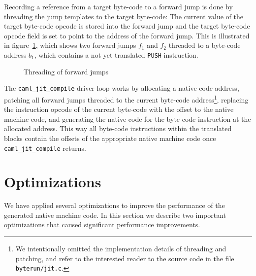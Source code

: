 \documentclass[a4paper]{acm_proc_article-sp}
\begin{document}
Recording a reference from a target byte-code to a forward jump is done by threading the
jump templates to the target byte-code: The current value of the target byte-code opcode
is stored into the forward jump and the target byte-code opcode field is set to point
to the address of the forward jump. This is illustrated in figure~\ref{figure:Threading_of_forward_jumps},
which shows two forward jumps $f_1$ and $f_2$ threaded to a byte-code address $b_1$,
which contains a not yet translated \texttt{PUSH} instruction.

\begin{figure}[htb]
  \centering
  \caption{Threading of forward jumps}
  \label{figure:Threading_of_forward_jumps}
\end{figure}

The \texttt{caml\_jit\_compile} driver loop works by allocating a native code address,
patching all forward jumps threaded to the current byte-code address\footnote{We intentionally
omitted the implementation details of threading and patching, and refer to the interested
reader to the source code in the file \texttt{byterun/jit.c}.}, replacing the
instruction opcode of the current byte-code with the offset to the native machine code,
and generating the native code for the byte-code instruction at the allocated address.
This way all byte-code instructions within the translated blocks contain the offsets
of the appropriate native machine code once \texttt{caml\_jit\_compile} returns.


\section{Optimizations}

We have applied several optimizations to improve the performance of the generated
native machine code. In this section we describe two important optimizations that
caused significant performance improvements.
\end{document}
